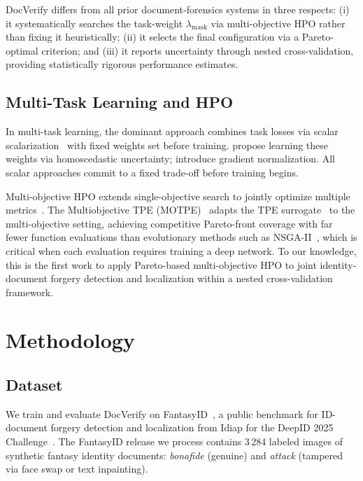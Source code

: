 \documentclass[final,5p,times,twocolumn,number]{elsarticle}
\begin{document}
DocVerify differs from all prior document-forensics systems in three respects:
(i) it systematically searches the task-weight $\lambda_{\text{mask}}$ via
multi-objective HPO rather than fixing it heuristically; (ii) it selects the
final configuration via a Pareto-optimal criterion; and (iii) it reports
uncertainty through nested cross-validation, providing statistically rigorous
performance estimates.

\subsection{Multi-Task Learning and HPO}

In multi-task learning, the
dominant approach combines task losses via scalar scalarization~\citep{marler2004survey}
with fixed weights set before training. \citet{kendall2018multi} propose
learning these weights via homoscedastic uncertainty; \citet{liu2019end}
introduce gradient normalization. All scalar approaches commit to a fixed
trade-off before training begins.

Multi-objective HPO extends single-objective search to jointly optimize multiple
metrics~\citep{miettinen1999nonlinear}. The Multiobjective TPE
(MOTPE)~\citep{motpe2022} adapts the TPE surrogate~\citep{tpe2011} to the
multi-objective setting, achieving competitive Pareto-front coverage with far
fewer function evaluations than evolutionary methods such as
NSGA-II~\citep{nsga2_2002}, which is critical when each evaluation requires
training a deep network. To our knowledge, this is the first work to apply Pareto-based
multi-objective HPO to joint identity-document forgery detection and
localization within a nested cross-validation framework.


\section{Methodology}
\label{sec:method}

\subsection{Dataset}
\label{subsec:dataset}

We train and evaluate DocVerify on FantasyID~\citep{fantasyid2024}, a public
benchmark for ID-document forgery detection and localization from Idiap for the
DeepID 2025 Challenge~\citep{deepid2025challenge}. The FantasyID release we
process contains 3\,284 labeled images of synthetic fantasy identity documents: \textit{bonafide}
(genuine) and \textit{attack} (tampered via face swap or text inpainting).
\end{document}
